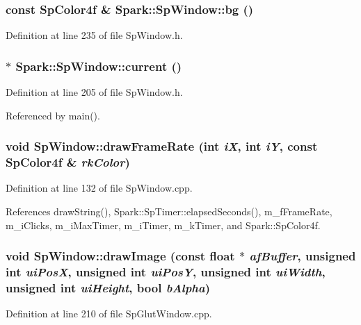 \subsubsection{\setlength{\rightskip}{0pt plus 5cm}const {\bf Sp\-Color4f} \& Spark::Sp\-Window::bg ()\hspace{0.3cm}{\tt  [inline]}}\label{classSpark_1_1SpWindow_a29}


Definition at line 235 of file Sp\-Window.h.
\subsubsection{ $\ast$ Spark::Sp\-Window::current ()\hspace{0.3cm}{\tt  [inline, static]}}\label{classSpark_1_1SpWindow_e0}


Definition at line 205 of file Sp\-Window.h.

Referenced by main().
\subsubsection{\setlength{\rightskip}{0pt plus 5cm}void Sp\-Window::draw\-Frame\-Rate (int {\em i\-X}, int {\em i\-Y}, const {\bf Sp\-Color4f} \& {\em rk\-Color})}\label{classSpark_1_1SpWindow_a19}


Definition at line 132 of file Sp\-Window.cpp.

References draw\-String(), Spark::Sp\-Timer::elapsed\-Seconds(), m\_\-f\-Frame\-Rate, m\_\-i\-Clicks, m\_\-i\-Max\-Timer, m\_\-i\-Timer, m\_\-k\-Timer, and Spark::Sp\-Color4f.
\subsubsection{\setlength{\rightskip}{0pt plus 5cm}void Sp\-Window::draw\-Image (const float $\ast$ {\em af\-Buffer}, unsigned int {\em ui\-Pos\-X}, unsigned int {\em ui\-Pos\-Y}, unsigned int {\em ui\-Width}, unsigned int {\em ui\-Height}, bool {\em b\-Alpha})}\label{classSpark_1_1SpWindow_a17}


Definition at line 210 of file Sp\-Glut\-Window.cpp.

